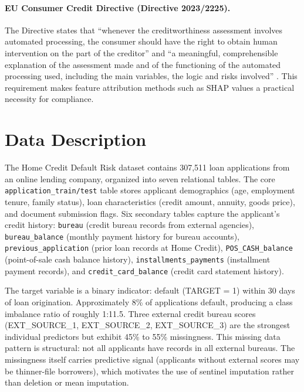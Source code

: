 \documentclass[11pt, a4paper]{article}
\begin{document}
\paragraph{EU Consumer Credit Directive (Directive 2023/2225).} The Directive states that ``whenever the creditworthiness assessment involves automated processing, the consumer should have the right to obtain human intervention on the part of the creditor'' and ``a meaningful, comprehensible explanation of the assessment made and of the functioning of the automated processing used, including the main variables, the logic and risks involved'' \parencite{eu_consumer_credit_directive_2023}. This requirement makes feature attribution methods such as SHAP values a practical necessity for compliance.

\section{Data Description}
\label{sec:data}

The Home Credit Default Risk dataset contains 307,511 loan applications from an online lending company, organized into seven relational tables. The core \texttt{application\_train/test} table stores applicant demographics (age, employment tenure, family status), loan characteristics (credit amount, annuity, goods price), and document submission flags. Six secondary tables capture the applicant's credit history: \texttt{bureau} (credit bureau records from external agencies), \texttt{bureau\_balance} (monthly payment history for bureau accounts), \texttt{previous\_application} (prior loan records at Home Credit), \texttt{POS\_CASH\_balance} (point-of-sale cash balance history), \texttt{installments\_payments} (installment payment records), and \texttt{credit\_card\_balance} (credit card statement history).

The target variable is a binary indicator: default (TARGET = 1) within 30 days of loan origination. Approximately 8\% of applications default, producing a class imbalance ratio of roughly 1:11.5. Three external credit bureau scores (EXT\_SOURCE\_1, EXT\_SOURCE\_2, EXT\_SOURCE\_3) are the strongest individual predictors but exhibit 45\% to 55\% missingness. This missing data pattern is structural: not all applicants have records in all external bureaus. The missingness itself carries predictive signal (applicants without external scores may be thinner-file borrowers), which motivates the use of sentinel imputation rather than deletion or mean imputation.
\end{document}
